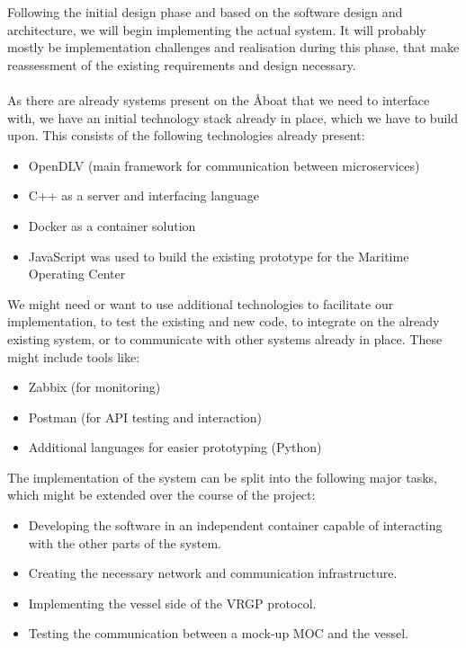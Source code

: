 Following the initial design phase and based on the software design and architecture, we will begin implementing the actual system. It will probably mostly be implementation challenges and realisation during this phase, that make reassessment of the existing requirements and design necessary.
\\\\
As there are already systems present on the Åboat that we need to interface with, we have an initial technology stack already in place, which we have to build upon. This consists of the following technologies already present:

\begin{itemize}
	\item OpenDLV (main framework for communication between microservices)
	\item C++ as a server and interfacing language
	\item Docker as a container solution
	\item JavaScript was used to build the existing prototype for the Maritime Operating Center
\end{itemize}

\noindent
We might need or want to use additional technologies to facilitate our implementation, to test the existing and new code, to integrate on the already existing system, or to communicate with other systems already in place. These might include tools like:

\begin{itemize}
	\item Zabbix (for monitoring)
	\item Postman (for API testing and interaction)
	\item Additional languages for easier prototyping (Python)
\end{itemize}

\noindent
The implementation of the system can be split into the following major tasks, which might be extended over the course of the project:

\begin{itemize}
	\item Developing the software in an independent container capable of interacting with the other parts of the system.
	\item Creating the necessary network and communication infrastructure.
	\item Implementing the vessel side of the VRGP protocol.
	\item Testing the communication between a mock-up MOC and the vessel.
\end{itemize}

